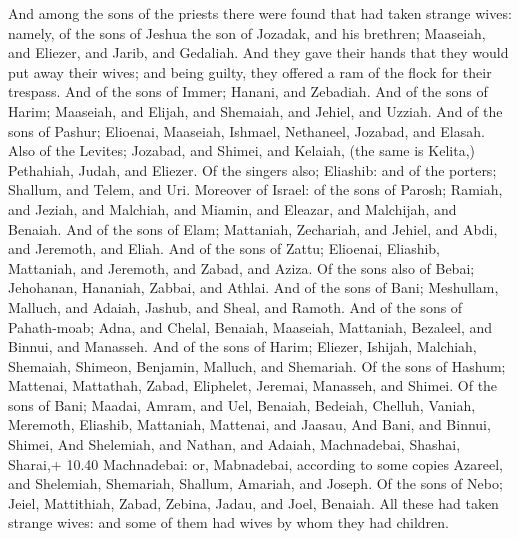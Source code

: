  And among the sons of the priests there were found that
had taken strange wives: namely, of the sons of Jeshua the son of
Jozadak, and his brethren; Maaseiah, and Eliezer, and Jarib, and
Gedaliah.  And they gave their hands that they would put
away their wives; and being guilty, they offered a ram of the flock for
their trespass.  And of the sons of Immer; Hanani, and
Zebadiah.  And of the sons of Harim; Maaseiah, and Elijah,
and Shemaiah, and Jehiel, and Uzziah.  And of the sons of
Pashur; Elioenai, Maaseiah, Ishmael, Nethaneel, Jozabad, and Elasah.
 Also of the Levites; Jozabad, and Shimei, and Kelaiah,
(the same is Kelita,) Pethahiah, Judah, and Eliezer.  Of
the singers also; Eliashib: and of the porters; Shallum, and Telem, and
Uri.  Moreover of Israel: of the sons of Parosh; Ramiah,
and Jeziah, and Malchiah, and Miamin, and Eleazar, and Malchijah, and
Benaiah.  And of the sons of Elam; Mattaniah, Zechariah,
and Jehiel, and Abdi, and Jeremoth, and Eliah.  And of the
sons of Zattu; Elioenai, Eliashib, Mattaniah, and Jeremoth, and Zabad,
and Aziza.  Of the sons also of Bebai; Jehohanan, Hananiah,
Zabbai, and Athlai.  And of the sons of Bani; Meshullam,
Malluch, and Adaiah, Jashub, and Sheal, and Ramoth.  And of
the sons of Pahath-moab; Adna, and Chelal, Benaiah, Maaseiah, Mattaniah,
Bezaleel, and Binnui, and Manasseh.  And of the sons of
Harim; Eliezer, Ishijah, Malchiah, Shemaiah, Shimeon, 
Benjamin, Malluch, and Shemariah.  Of the sons of Hashum;
Mattenai, Mattathah, Zabad, Eliphelet, Jeremai, Manasseh, and Shimei.
 Of the sons of Bani; Maadai, Amram, and Uel, 
Benaiah, Bedeiah, Chelluh,  Vaniah, Meremoth, Eliashib,
 Mattaniah, Mattenai, and Jaasau,  And Bani,
and Binnui, Shimei,  And Shelemiah, and Nathan, and Adaiah,
 Machnadebai, Shashai, Sharai,+ 10.40 Machnadebai: or,
Mabnadebai, according to some copies  Azareel, and
Shelemiah, Shemariah,  Shallum, Amariah, and Joseph.
 Of the sons of Nebo; Jeiel, Mattithiah, Zabad, Zebina,
Jadau, and Joel, Benaiah.  All these had taken strange
wives: and some of them had wives by whom they had children.
